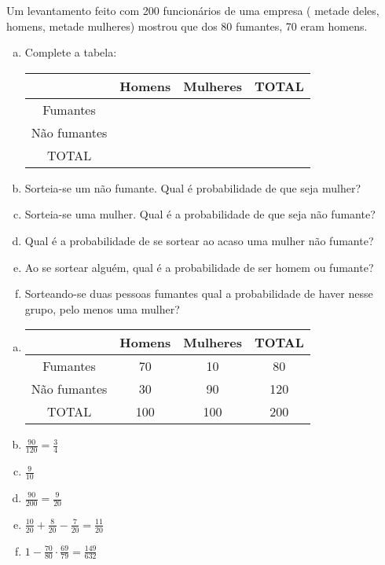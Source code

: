 \begin{ex}
Um levantamento feito com 200 funcionários de uma empresa ( metade deles, homens, metade mulheres) mostrou que dos  80 fumantes, 70 eram homens.
   \begin{enumerate}[(a)]
   \item Complete a tabela:
   \begin{center}
   \begin{tabular}{|c|c|c|c|} \hline
       &  Homens  &  Mulheres  &  TOTAL  \\    \hline
   Fumantes    &          &            &         \\    \hline
   Não fumantes  &          &            &         \\    \hline
   TOTAL      &          &            &         \\    \hline
   \end{tabular}

   \end{center}    
   \item Sorteia-se um não fumante. Qual é probabilidade de que seja mulher?
   \item Sorteia-se uma mulher. Qual é a probabilidade de que seja não fumante?
   \item Qual é a probabilidade de se sortear ao acaso uma mulher não fumante?
   \item Ao se sortear alguém, qual é a probabilidade de ser homem ou fumante?
   \item Sorteando-se duas pessoas fumantes qual a probabilidade de haver nesse grupo, pelo        menos uma mulher? 
   \end{enumerate}
     \begin{sol}
      \phantom{A}
       \begin{enumerate}  [(a)]
           \item  \begin{tabular}{|c|c|c|c|} \hline
       &  Homens  &  Mulheres  &  TOTAL  \\    \hline
   Fumantes    & 70 & 10 & 80 \\    \hline
   Não fumantes  & 30  & 90 & 120 \\    \hline
   TOTAL      & 100  & 100  &  200   \\    \hline
   \end{tabular}
          \item $\frac{90}{120}=\frac{3}{4}$
          \item $\frac{9}{10}$
          \item $\frac{90}{200}=\frac{9}{20}$
          \item $\frac{10}{20}+\frac{8}{20}-\frac{7}{20}=\frac{11}{20}$
          \item $1-\frac{70}{80}\cdot\frac{69}{79}=\frac{149}{632}$
       \end{enumerate}
       
     \end{sol}
\end{ex}